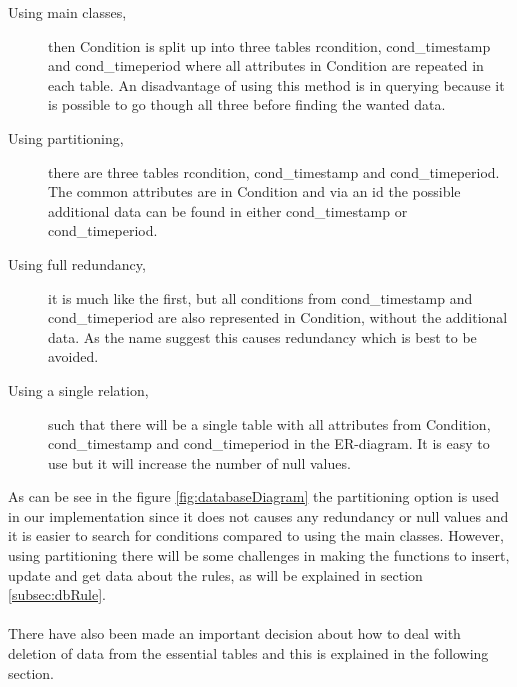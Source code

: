 \begin{description}
	\item[Using main classes,] then Condition is split up into three tables rcondition, cond\_timestamp and cond\_timeperiod where all attributes in Condition are repeated in each table. An disadvantage of using this method is in querying because it is possible to go though all three before finding the wanted data.
	\item[Using partitioning,] there are three tables rcondition, cond\_timestamp and cond\_timeperiod. The common attributes are in Condition and via an id the possible additional data can be found in either cond\_timestamp or cond\_timeperiod.
	\item[Using full redundancy,] it is much like the first, but all conditions from cond\_timestamp and cond\_timeperiod are also represented in Condition, without the additional data. As the name suggest this causes redundancy which is best to be avoided.
	\item[Using a single relation,] such that there will be a single table with all attributes from Condition, cond\_timestamp and cond\_timeperiod in the ER-diagram. It is easy to use but it will increase the number of null values. 
\end{description}

As can be see in the figure \ref{fig:databaseDiagram} the partitioning option is used in our implementation since it does not causes any redundancy or null values and it is easier to search for conditions compared to using the main classes. However, using partitioning there will be some challenges in making the functions to insert, update and get data about the rules, as will be explained in section \vref{subsec:dbRule}.\\\\

There have also been made an important decision about how to deal with deletion of data from the essential tables and this is explained in the following section.
 
